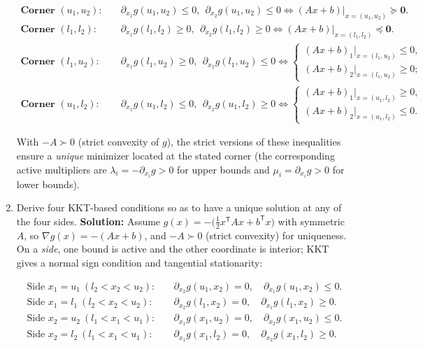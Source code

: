 \documentclass[11pt]{article}
\begin{document}
\begin{enumerate}[label=2(\alph*)]
		\[
		\begin{aligned}
			\textbf{Corner }(u_1,u_2):\quad 
			&\partial_{x_1} g(u_1,u_2) \le 0,\ \ \partial_{x_2} g(u_1,u_2) \le 0 
			\iff (A x + b)\big|_{x=(u_1,u_2)} \succeq \mathbf{0}.\\[4pt]
			\textbf{Corner }(l_1,l_2):\quad 
			&\partial_{x_1} g(l_1,l_2) \ge 0,\ \ \partial_{x_2} g(l_1,l_2) \ge 0 
			\iff (A x + b)\big|_{x=(l_1,l_2)} \preceq \mathbf{0}.\\[4pt]
			\textbf{Corner }(l_1,u_2):\quad 
			&\partial_{x_1} g(l_1,u_2) \ge 0,\ \ \partial_{x_2} g(l_1,u_2) \le 0 
			\iff \begin{cases}
				(A x + b)_1\big|_{x=(l_1,u_2)} \le 0,\\
				(A x + b)_2\big|_{x=(l_1,u_2)} \ge 0;
			\end{cases}\\[6pt]
			\textbf{Corner }(u_1,l_2):\quad 
			&\partial_{x_1} g(u_1,l_2) \le 0,\ \ \partial_{x_2} g(u_1,l_2) \ge 0 
			\iff \begin{cases}
				(A x + b)_1\big|_{x=(u_1,l_2)} \ge 0,\\
				(A x + b)_2\big|_{x=(u_1,l_2)} \le 0.
			\end{cases}
		\end{aligned}
		\]
		
		With $-A \succ 0$ (strict convexity of $g$), the strict versions of these inequalities ensure a \emph{unique} minimizer located at the stated corner (the corresponding active multipliers are $\lambda_i=-\partial_{x_i} g>0$ for upper bounds and $\mu_i=\partial_{x_i} g>0$ for lower bounds).

		\item Derive four KKT-based conditions so as to have a unique solution at any of the four sides.
		\textbf{Solution:}
		Assume $g(x)=-\big(\tfrac{1}{2}x^{\mathsf T}Ax+b^{\mathsf T}x\big)$ with symmetric $A$, so $\nabla g(x)=-(Ax+b)$, and $-A\succ0$ (strict convexity) for uniqueness.  
		On a \emph{side}, one bound is active and the other coordinate is interior; KKT gives a normal sign condition and tangential stationarity:
		
		\[
		\begin{aligned}
			\text{Side }x_1=u_1 \ (l_2<x_2< u_2):\quad 
			&\partial_{x_2} g(u_1,x_2)=0,\quad \partial_{x_1} g(u_1,x_2)\le 0.\\
			\text{Side }x_1=l_1 \ (l_2<x_2< u_2):\quad 
			&\partial_{x_2} g(l_1,x_2)=0,\quad \partial_{x_1} g(l_1,x_2)\ge 0.\\
			\text{Side }x_2=u_2 \ (l_1<x_1< u_1):\quad 
			&\partial_{x_1} g(x_1,u_2)=0,\quad \partial_{x_2} g(x_1,u_2)\le 0.\\
			\text{Side }x_2=l_2 \ (l_1<x_1< u_1):\quad 
			&\partial_{x_1} g(x_1,l_2)=0,\quad \partial_{x_2} g(x_1,l_2)\ge 0.
		\end{aligned}
		\]
		

\end{enumerate}
\end{document}
